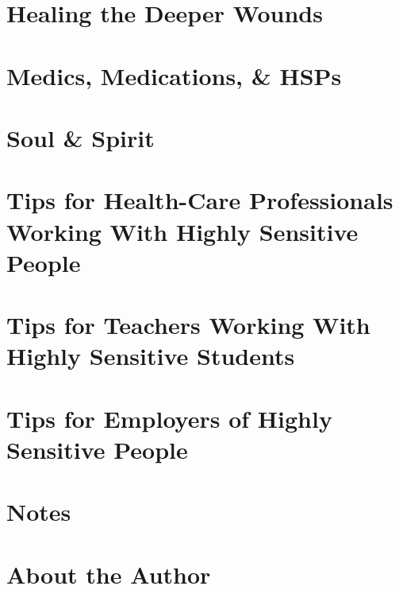 \documentclass{article}
\numberwithin{equation}{section}
\begin{document}

\section{Healing the Deeper Wounds}


\section{Medics, Medications, \& HSPs}


\section{Soul \& Spirit}


\section{Tips for Health-Care Professionals Working With Highly Sensitive People}


\section{Tips for Teachers Working With Highly Sensitive Students}


\section{Tips for Employers of Highly Sensitive People}


\section{Notes}


\section{About the Author}


\printbibliography[heading=bibintoc]
	
\end{document}

